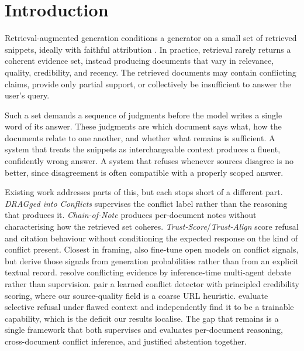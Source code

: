 \documentclass{article} %
\begin{document}
\section{Introduction}
\label{sec:intro}

Retrieval-augmented generation conditions a generator on a small set of retrieved
snippets, ideally with faithful attribution
\citep{lewis2020rag,borgeaud2022,gao2024retrievalaugmentedgenerationlargelanguage,guu2020realm}.
In practice, retrieval rarely returns a coherent evidence set, instead
producing documents that vary in relevance, quality, credibility, and recency.
The retrieved documents may contain conflicting claims, provide only partial
support, or collectively be insufficient to answer the user's query.

Such a set demands a sequence of judgments before the model writes a single
word of its answer. These judgments are which document says what, how the
documents relate to one another, and whether what remains is sufficient. A
system that treats the snippets as interchangeable context produces a fluent,
confidently wrong answer. A system that refuses whenever sources disagree is
no better, since disagreement is often compatible with a properly scoped
answer.

Existing work addresses parts of this, but each stops short of a different part.
\textit{DRAGged into Conflicts} \citep{cattan2025dragged} supervises the conflict
label rather than the reasoning that produces it. \textit{Chain-of-Note}
\citep{yu2024chainofnote} produces per-document notes without characterising how the
retrieved set coheres. \textit{Trust-Score}/\textit{Trust-Align}
\citep{song2025trustalign} score refusal and citation behaviour without conditioning
the expected response on the kind of conflict present. Closest in framing, \citet{wu2026conflictaware} also fine-tune open models on
conflict signals, but derive those signals from generation probabilities rather
than from an explicit textual record. \citet{wang2025conflictingevidence}
resolve conflicting evidence by inference-time multi-agent debate rather than
supervision. \citet{wang2026conflictrag} pair a learned conflict detector
with principled credibility scoring, where our source-quality field is a coarse
URL heuristic. \citet{muhamed2025refusalbench} evaluate selective refusal
under flawed context and independently find it to be a trainable capability,
which is the deficit our results localise. The gap that remains is a single
framework that both supervises and evaluates per-document reasoning,
cross-document conflict inference, and justified abstention together.
\end{document}
